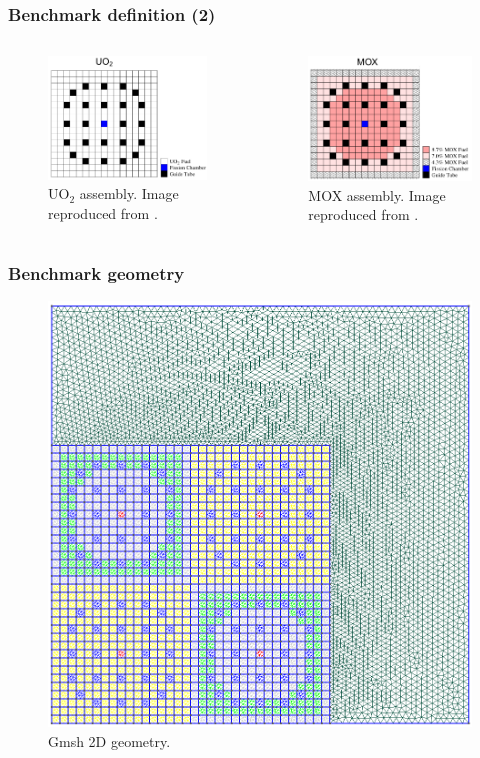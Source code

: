\begin{frame}
\frametitle{Benchmark definition (2)}

\begin{columns}
    \column[t]{5.5cm}
    \begin{figure}[htbp!]
        \begin{center}
            \includegraphics[width=5.5cm]{figures/bench-config2}
        \end{center}
        \caption{UO$_2$ assembly. Image reproduced from \cite{capilla_applications_2009}.}
    \end{figure}

    \column[t]{5.5cm}
    \begin{figure}[htbp!]
        \begin{center}
            \includegraphics[width=5.5cm]{figures/bench-config3}
        \end{center}
        \caption{MOX assembly. Image reproduced from \cite{capilla_applications_2009}.}
    \end{figure}
\end{columns}
\end{frame}


\begin{frame}
\frametitle{Benchmark geometry}

    \begin{figure}[htbp!]
        \begin{center}
            \includegraphics[width=6.cm]{figures/bench-mesh}
        \end{center}
        \caption{Gmsh 2D geometry.}
    \end{figure}

\end{frame}


